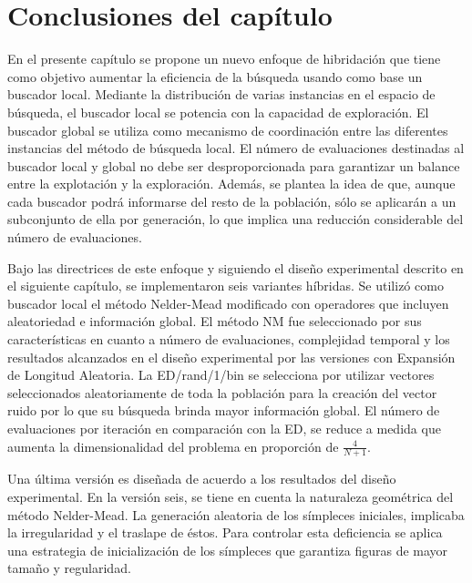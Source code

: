 \section{Conclusiones del capítulo}
En el presente capítulo se propone un nuevo enfoque de hibridación que tiene como objetivo aumentar la eficiencia de la búsqueda usando como base un buscador local. Mediante la distribución de varias instancias en el espacio de búsqueda, el buscador local se potencia  con la capacidad de exploración. El buscador global se utiliza como mecanismo de coordinación entre las diferentes instancias del método de búsqueda local. El número de evaluaciones destinadas al buscador local y global no debe ser desproporcionada para garantizar un balance entre la explotación y la exploración. Además, se plantea la idea de que, aunque cada buscador podrá informarse del resto de la población, sólo se aplicarán a un subconjunto de ella por generación, lo que implica una reducción considerable del número de evaluaciones.

Bajo las directrices de este enfoque y siguiendo el diseño experimental descrito en el siguiente capítulo, se implementaron seis variantes híbridas. Se utilizó como buscador local el método Nelder-Mead modificado con operadores que incluyen aleatoriedad e información global. El método NM fue seleccionado por sus características en cuanto a número de evaluaciones, complejidad temporal y los resultados alcanzados en el diseño experimental por las versiones con Expansión de Longitud Aleatoria. La ED/rand/1/bin se selecciona por utilizar vectores seleccionados aleatoriamente de toda la población para la creación del vector ruido por lo que su búsqueda brinda mayor información global. El número de evaluaciones por iteración en comparación con la ED, se reduce a medida que aumenta la dimensionalidad del problema en proporción de $\frac{4}{N+1}$.

Una última versión es diseñada de acuerdo a los resultados del diseño experimental. En la versión seis, se tiene en cuenta la naturaleza geométrica del método Nelder-Mead. La generación aleatoria de los símpleces iniciales, implicaba la irregularidad y el traslape de éstos. Para controlar esta deficiencia se aplica una estrategia de inicialización de los símpleces que garantiza figuras de mayor tamaño y regularidad.  
